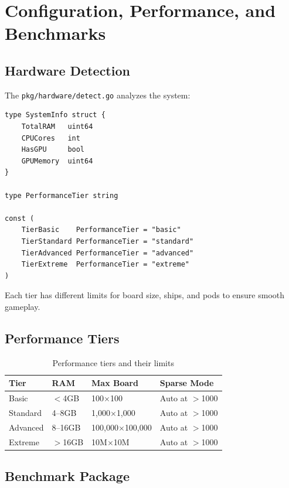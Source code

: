 \documentclass[11pt]{article}
\begin{document}
\section{Configuration, Performance, and Benchmarks}


\subsection{Hardware Detection}

The \texttt{pkg/hardware/detect.go} analyzes the system:

\begin{lstlisting}
type SystemInfo struct {
    TotalRAM   uint64
    CPUCores   int
    HasGPU     bool
    GPUMemory  uint64
}

type PerformanceTier string

const (
    TierBasic    PerformanceTier = "basic"
    TierStandard PerformanceTier = "standard"
    TierAdvanced PerformanceTier = "advanced"
    TierExtreme  PerformanceTier = "extreme"
)
\end{lstlisting}

Each tier has different limits for board size, ships, and pods to ensure smooth gameplay.

\subsection{Performance Tiers}

\begin{table}[H]
\centering
\begin{tabular}{@{}llll@{}}
\toprule
\textbf{Tier} & \textbf{RAM} & \textbf{Max Board} & \textbf{Sparse Mode} \\
\midrule
Basic & $<$4GB & 100$\times$100 & Auto at $>$1000 \\
Standard & 4--8GB & 1,000$\times$1,000 & Auto at $>$1000 \\
Advanced & 8--16GB & 100,000$\times$100,000 & Auto at $>$1000 \\
Extreme & $>$16GB & 10M$\times$10M & Auto at $>$1000 \\
\bottomrule
\end{tabular}
\caption{Performance tiers and their limits}
\label{tab:tiers}
\end{table}

\subsection{Benchmark Package}
\end{document}
